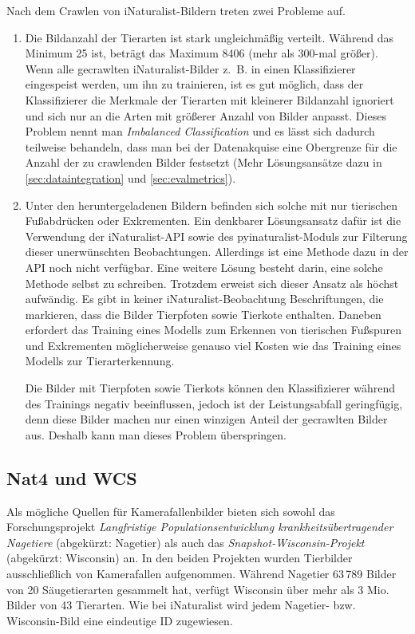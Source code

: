 Nach dem Crawlen von iNaturalist-Bildern treten zwei Probleme auf.

\begin{enumerate}
	\item Die Bildanzahl der Tierarten ist stark ungleichmäßig verteilt. Während das Minimum 25 ist, beträgt das Maximum 8406 (mehr als 300-mal größer). Wenn alle gecrawlten iNaturalist-Bilder z.~B. in einen Klassifizierer eingespeist werden, um ihn zu trainieren, ist es gut möglich, dass der Klassifizierer die Merkmale der Tierarten mit kleinerer Bildanzahl ignoriert und sich nur an die Arten mit größerer Anzahl von Bilder anpasst. Dieses Problem nennt man \emph{Imbalanced Classification} und es lässt sich dadurch teilweise behandeln, dass man bei der Datenakquise eine Obergrenze für die Anzahl der zu crawlenden Bilder festsetzt (Mehr Lösungsansätze dazu in \autoref{sec:dataintegration} und \autoref{sec:evalmetrics}).

	\item Unter den heruntergeladenen Bildern befinden sich solche mit nur tierischen Fußabdrücken oder Exkrementen. Ein denkbarer Lösungsansatz dafür ist die Verwendung der iNaturalist-API sowie des pyinaturalist-Moduls zur Filterung dieser unerwünschten Beobachtungen. Allerdings ist eine Methode dazu in der API noch nicht verfügbar. Eine weitere Lösung besteht darin, eine solche Methode selbst zu schreiben. Trotzdem erweist sich dieser Ansatz als höchst aufwändig. Es gibt in keiner iNaturalist-Beobachtung Beschriftungen, die markieren, dass die Bilder Tierpfoten sowie Tierkote enthalten. Daneben erfordert das Training eines Modells zum Erkennen von tierischen Fußspuren und Exkrementen möglicherweise genauso viel Kosten wie das Training eines Modells zur Tierarterkennung.
	
	Die Bilder mit Tierpfoten sowie Tierkots können den Klassifizierer während des Trainings negativ beeinflussen, jedoch ist der Leistungsabfall geringfügig, denn diese Bilder machen nur einen winzigen Anteil der gecrawlten Bilder aus. Deshalb kann man dieses Problem überspringen.
\end{enumerate}

\subsection{Nat4 und WCS}

Als mögliche Quellen für Kamerafallenbilder bieten sich sowohl das Forschungsprojekt \emph{Langfristige Populationsentwicklung krankheitsübertragender Nagetiere} (abgekürzt: Nagetier) \cite{imholt2021langfristige} als auch das \emph{Snapshot-Wisconsin-Projekt} (abgekürzt: Wisconsin) an. In den beiden Projekten wurden Tierbilder ausschließlich von Kamerafallen aufgenommen. Während Nagetier 63\,789 Bilder von 20 Säugetierarten gesammelt hat, verfügt Wisconsin über mehr als 3 Mio. Bilder von 43 Tierarten. Wie bei iNaturalist wird jedem Nagetier- bzw. Wisconsin-Bild eine eindeutige ID zugewiesen.

